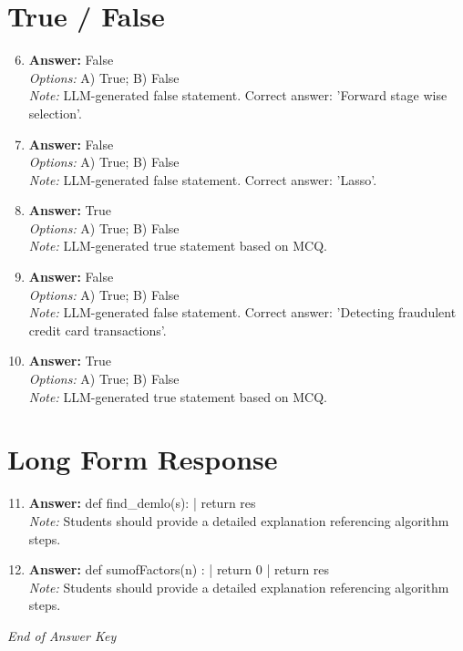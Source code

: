 \documentclass[12pt]{article}
\begin{document}
\section*{True / False}
\begin{enumerate}[label=\arabic*.]
\setcounter{enumi}{5}
\item \textbf{Answer:} False
\\ \textit{Options:} A) True; B) False
\\ \textit{Note:} LLM-generated false statement. Correct answer: 'Forward stage wise selection'.
\item \textbf{Answer:} False
\\ \textit{Options:} A) True; B) False
\\ \textit{Note:} LLM-generated false statement. Correct answer: 'Lasso'.
\item \textbf{Answer:} True
\\ \textit{Options:} A) True; B) False
\\ \textit{Note:} LLM-generated true statement based on MCQ.
\item \textbf{Answer:} False
\\ \textit{Options:} A) True; B) False
\\ \textit{Note:} LLM-generated false statement. Correct answer: 'Detecting fraudulent credit card transactions'.
\item \textbf{Answer:} True
\\ \textit{Options:} A) True; B) False
\\ \textit{Note:} LLM-generated true statement based on MCQ.
\end{enumerate}

\section*{Long Form Response}
\begin{enumerate}[label=\arabic*.]
\setcounter{enumi}{10}
\item \textbf{Answer:} def find\_demlo(s): | return res
\\ \textit{Note:} Students should provide a detailed explanation referencing algorithm steps.
\item \textbf{Answer:} def sumofFactors(n) : | return 0 | return res
\\ \textit{Note:} Students should provide a detailed explanation referencing algorithm steps.
\end{enumerate}

\vfill
\noindent\textit{End of Answer Key}
\end{document}

